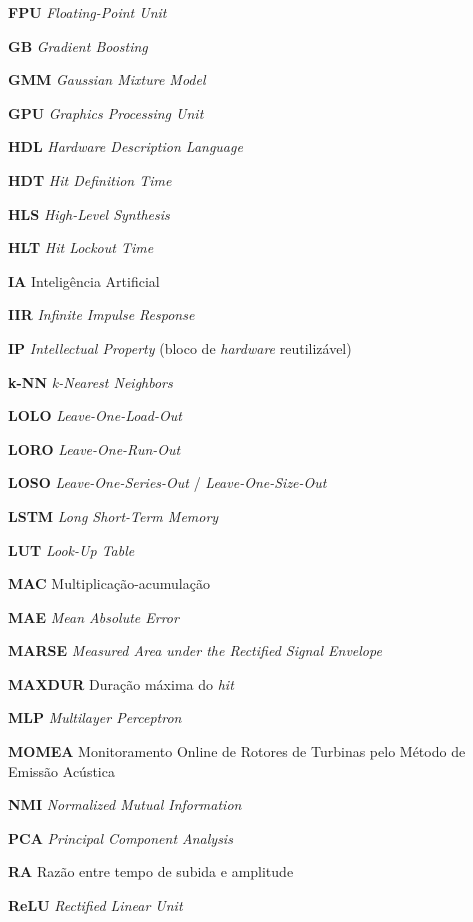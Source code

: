 \documentclass[
	12pt,				%
	oneside,
	a4paper,			%
	english,			%
	french,				%
	spanish,			%
	brazil				%
	]{abntex2}
\begin{document}
\begin{siglas}
	\item[\textbf{FPU}] \textit{Floating-Point Unit}
	\item[\textbf{GB}] \textit{Gradient Boosting}
	\item[\textbf{GMM}] \textit{Gaussian Mixture Model}
	\item[\textbf{GPU}] \textit{Graphics Processing Unit}
	\item[\textbf{HDL}] \textit{Hardware Description Language}
	\item[\textbf{HDT}] \textit{Hit Definition Time}
	\item[\textbf{HLS}] \textit{High-Level Synthesis}
	\item[\textbf{HLT}] \textit{Hit Lockout Time}
	\item[\textbf{IA}] Inteligência Artificial
	\item[\textbf{IIR}] \textit{Infinite Impulse Response}
	\item[\textbf{IP}] \textit{Intellectual Property} (bloco de \textit{hardware} reutilizável)
	\item[\textbf{k-NN}] \textit{k-Nearest Neighbors}
	\item[\textbf{LOLO}] \textit{Leave-One-Load-Out}
	\item[\textbf{LORO}] \textit{Leave-One-Run-Out}
	\item[\textbf{LOSO}] \textit{Leave-One-Series-Out} / \textit{Leave-One-Size-Out}
	\item[\textbf{LSTM}] \textit{Long Short-Term Memory}
	\item[\textbf{LUT}] \textit{Look-Up Table}
	\item[\textbf{MAC}] Multiplicação-acumulação
	\item[\textbf{MAE}] \textit{Mean Absolute Error}
	\item[\textbf{MARSE}] \textit{Measured Area under the Rectified Signal Envelope}
	\item[\textbf{MAXDUR}] Duração máxima do \textit{hit}
	\item[\textbf{MLP}] \textit{Multilayer Perceptron}
	\item[\textbf{MOMEA}] Monitoramento Online de Rotores de Turbinas pelo Método de Emissão Acústica
	\item[\textbf{NMI}] \textit{Normalized Mutual Information}
	\item[\textbf{PCA}] \textit{Principal Component Analysis}
	\item[\textbf{RA}] Razão entre tempo de subida e amplitude
	\item[\textbf{ReLU}] \textit{Rectified Linear Unit}

\end{siglas}
\end{document}
